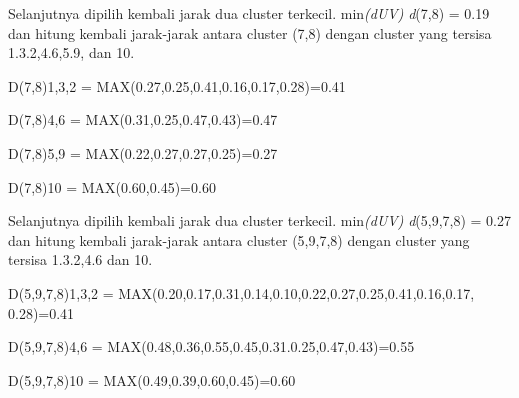 \begin{enumerate}
Selanjutnya dipilih kembali jarak dua cluster terkecil. min\textit{(dUV)} \textit{d}(7,8) = 0.19 dan hitung kembali jarak-jarak antara cluster (7,8)  dengan cluster yang tersisa 1.3.2,4.6,5.9, dan 10. 

D(7,8)1,3,2 = MAX(0.27,0.25,0.41,0.16,0.17,0.28)=0.41 
 
D(7,8)4,6 = MAX(0.31,0.25,0.47,0.43)=0.47 

D(7,8)5,9 = MAX(0.22,0.27,0.27,0.25)=0.27 

D(7,8)10 = MAX(0.60,0.45)=0.60 
 
\begin{table}[htbp]
\centering
\caption{ Matrik Jarak, d(7,8) }
\label{tab:my-table}
\end{table}

Selanjutnya dipilih kembali jarak dua cluster terkecil. min\textit{(dUV)} \textit{d}(5,9,7,8) = 0.27 dan hitung kembali jarak-jarak antara cluster (5,9,7,8)  dengan cluster yang tersisa 1.3.2,4.6 dan 10.

D(5,9,7,8)1,3,2 = MAX(0.20,0.17,0.31,0.14,0.10,0.22,0.27,0.25,0.41,0.16,0.17,\\0.28)=0.41

D(5,9,7,8)4,6 = MAX(0.48,0.36,0.55,0.45,0.31.0.25,0.47,0.43)=0.55

D(5,9,7,8)10 = MAX(0.49,0.39,0.60,0.45)=0.60

\begin{table}[htbp]
\centering
\caption{Matrik Jarak, d(5,9,7,8)}
\label{tab:my-table}
\end{table}
\end{enumerate}

